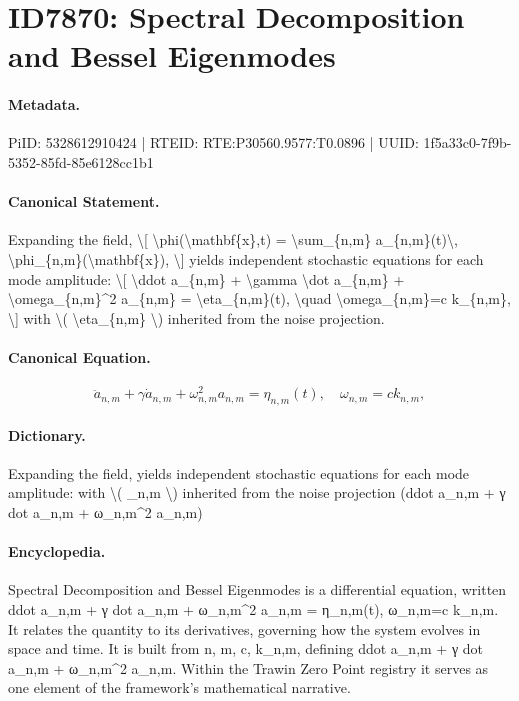 \section*{ID7870: Spectral Decomposition and Bessel Eigenmodes}
\paragraph{Metadata.}
PiID: 5328612910424 | RTEID: RTE:P30560.9577:T0.0896 | UUID: 1f5a33c0-7f9b-5352-85fd-85e6128cc1b1

\paragraph{Canonical Statement.}
Expanding the field, \textbackslash{}[ \textbackslash{}phi(\textbackslash{}mathbf\{x\},t) = \textbackslash{}sum\_\{n,m\} a\_\{n,m\}(t)\textbackslash{}, \textbackslash{}phi\_\{n,m\}(\textbackslash{}mathbf\{x\}), \textbackslash{}] yields independent stochastic equations for each mode amplitude: \textbackslash{}[ \textbackslash{}ddot a\_\{n,m\} + \textbackslash{}gamma \textbackslash{}dot a\_\{n,m\} + \textbackslash{}omega\_\{n,m\}\textasciicircum{}2 a\_\{n,m\} = \textbackslash{}eta\_\{n,m\}(t), \textbackslash{}quad \textbackslash{}omega\_\{n,m\}=c k\_\{n,m\}, \textbackslash{}] with \textbackslash{}( \textbackslash{}eta\_\{n,m\} \textbackslash{}) inherited from the noise projection.

\paragraph{Canonical Equation.}
\[
\ddot a_{n,m} + \gamma \dot a_{n,m} + \omega_{n,m}^2 a_{n,m} = \eta_{n,m}(t), \quad \omega_{n,m}=c k_{n,m},
\]

\paragraph{Dictionary.}
Expanding the field, yields independent stochastic equations for each mode amplitude: with \textbackslash{}( \_n,m \textbackslash{}) inherited from the noise projection (ddot a\_n,m + γ dot a\_n,m + ω\_n,m\textasciicircum{}2 a\_n,m)

\paragraph{Encyclopedia.}
Spectral Decomposition and Bessel Eigenmodes is a differential equation, written ddot a\_n,m + γ dot a\_n,m + ω\_n,m\textasciicircum{}2 a\_n,m = η\_n,m(t), ω\_n,m=c k\_n,m. It relates the quantity to its derivatives, governing how the system evolves in space and time. It is built from n, m, c, k\_n,m, defining ddot a\_n,m + γ dot a\_n,m + ω\_n,m\textasciicircum{}2 a\_n,m. Within the Trawin Zero Point registry it serves as one element of the framework's mathematical narrative.
